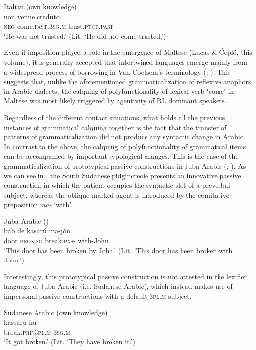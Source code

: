 \documentclass[output=paper]{langsci/langscibook}
\begin{document}
\ea\label{ex:key:24}
{Italian (own knowledge)} \\
\gll   non venne creduto\\
       \textsc{neg} come.\textsc{past.3sg.m} trust.\textsc{ptcp.past}\\
\glt   `He was not trusted.' (Lit. ‘He did not come trusted.’)
\z

Even if imposition played a role in the emergence of Maltese (Lucas \& Ćeplö, this volume), it is generally accepted that intertwined languages emerge mainly from a widespread process of borrowing in Van Coetsem’s terminology (\citealt[397]{Winford2005}; \citealt{Manfredi2018}). This suggests that, unlike the aforementioned grammaticalization of reflexive anaphors in Arabic dialects, the calquing of polyfunctionality of lexical verb ‘come’ in Maltese was most likely triggered by agentivity of RL dominant speakers. 

Regardless of the different contact situations, what holds all the previous instances of grammatical calquing together is the fact that the transfer of patterns of grammaticalization did not produce any syntactic change in Arabic. In contrast to the above, the calquing of polyfunctionality of grammatical items can be accompanied by important typological changes. This is the case of the grammaticalization of prototypical passive constructions in Juba Arabic (\citealt[92]{Manfredi2017}; \citeyear[415]{Manfredi2018}). As we can see in , the South Sudanese pidgincreole presents an innovative passive construction in which the patient occupies the syntactic slot of a preverbal subject, whereas the oblique-marked agent is introduced by the comitative preposition \textit{ma-} ‘with’.  

\ea\label{ex:key:passive}
{Juba Arabic (\citealt[86]{Manfredi2017})}\\
\gll   bab de kasurú ma-jón \\
       door \textsc{prox.sg} break.\textsc{pass} with-John\\
\glt   `This door has been broken by John.' (Lit. ‘This door has been broken with John.’)
\z
 
Interestingly, this prototypical passive construction is not attested in the lexifier language of Juba Arabic (i.e. Sudanese Arabic), which instead makes use of impersonal passive constructions with a default \textsc{3pl.m} subject.

\ea\label{ex:key:}
{Sudanese Arabic (own knowledge)}\\
\gll   kassaru-hu\\
       break.\textsc{prf.3pl.m-3sg.m}\\
\glt   `It got broken.' (Lit. ‘They have broken it.’) 
\z
\end{document}
